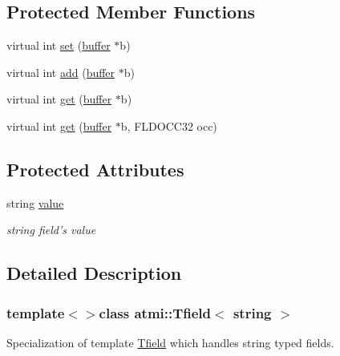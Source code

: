\subsection*{Protected Member Functions}
\begin{DoxyCompactItemize}
\item 
virtual int \hyperlink{classatmi_1_1_tfield_3_01string_01_4_aac572b9f5c296cdb4589ed409f4084ed}{set} (\hyperlink{classatmi_1_1buffer}{buffer} $\ast$b)
\item 
virtual int \hyperlink{classatmi_1_1_tfield_3_01string_01_4_a20be721257ccba7903a5fe4ed3dc672d}{add} (\hyperlink{classatmi_1_1buffer}{buffer} $\ast$b)
\item 
virtual int \hyperlink{classatmi_1_1_tfield_3_01string_01_4_a3001b8eb567de52e2193e54373721afe}{get} (\hyperlink{classatmi_1_1buffer}{buffer} $\ast$b)
\item 
virtual int \hyperlink{classatmi_1_1_tfield_3_01string_01_4_ad3936cbfcb487109f6e9cd2f32fd71c5}{get} (\hyperlink{classatmi_1_1buffer}{buffer} $\ast$b, F\+L\+D\+O\+C\+C32 occ)
\end{DoxyCompactItemize}
\subsection*{Protected Attributes}
\begin{DoxyCompactItemize}
\item 
\hypertarget{classatmi_1_1_tfield_3_01string_01_4_afba2608339682e6d6f10dd8bb9875cc6}{string \hyperlink{classatmi_1_1_tfield_3_01string_01_4_afba2608339682e6d6f10dd8bb9875cc6}{value}}\label{classatmi_1_1_tfield_3_01string_01_4_afba2608339682e6d6f10dd8bb9875cc6}

\begin{DoxyCompactList}\small\item\em string field's value \end{DoxyCompactList}\end{DoxyCompactItemize}


\subsection{Detailed Description}
\subsubsection*{template$<$$>$class atmi\+::\+Tfield$<$ string $>$}

Specialization of template \hyperlink{classatmi_1_1_tfield}{Tfield} which handles string typed fields.

